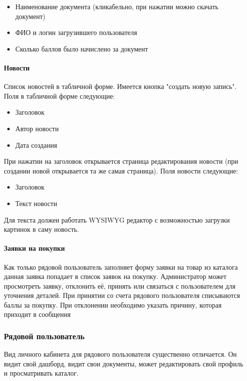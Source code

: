 \documentclass[DIV=calc, paper=a4, fontsize=11pt]{scrartcl} %
\begin{document}
\begin{itemize}
	\item Наименование документа (кликабельно, при нажатии можно скачать документ)
	\item ФИО и логин загрузившего пользователя
	\item Сколько баллов было начислено за документ
\end{itemize}

\paragraph{Новости}

Список новостей в табличной форме. Имеется кнопка "создать новую запись". Поля в табличной форме следующие:

\begin{itemize}
	\item Заголовок
	\item Автор новости
	\item Дата создания
\end{itemize}

При нажатии на заголовок открывается страница редактирования новости (при создании новой открывается та же самая страница). Поля новости следующие:

\begin{itemize}
	\item Заголовок
	\item Текст новости
\end{itemize}

Для текста должен работать WYSIWYG редактор с возможностью загрузки картинок в саму новость.

\paragraph{Заявки на покупки}
Как только рядовой пользователь заполняет форму заявки на товар из каталога данная заявка попадает в список заявок на покупку. Администратор может просмотреть заявку, отклонить её, принять или связаться с пользователем для уточнения деталей. При принятии со счета рядового пользователя списываются баллы за покупку. При отклонении необходимо указать причину, которая приходит в сообщения 


\subsubsection{Рядовой пользователь}

Вид личного кабинета для рядового пользователя существенно отличается. Он видит свой дашборд, видит свои документы, может редактировать свой профиль и просматривать каталог.
\end{document}
